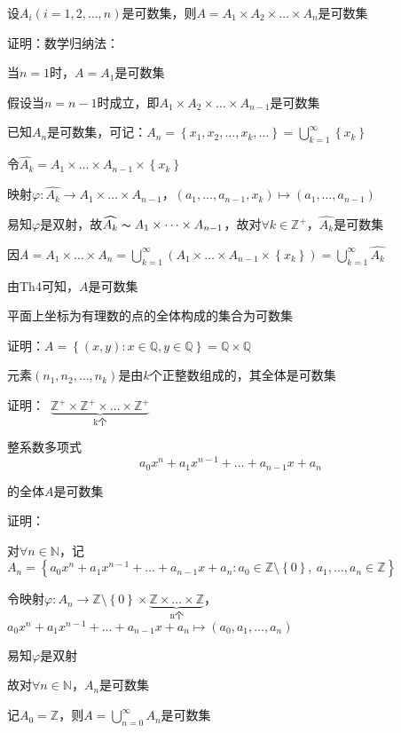 \begin{td}
设$A_{i}\left(i =1,2,\dots,n\right) $是可数集，则$A = A_{1} \times A_{2} \times \dots \times A_{n}$是可数集    
\end{td}
\noindent 证明：数学归纳法：
\par 当$n = 1$时，$A = A_{1}$是可数集
\par 假设当$n = n - 1$时成立，即$A_{1} \times A_{2} \times \dots \times A_{n-1}$是可数集
\par 已知$A_{n}$是可数集，可记：$A_{n} = \left\{x_{1},x_{2},\dots,x_{k},\dots\right\} = \bigcup \limits_{k=1}^{\infty}\left\{x_{k}\right\} $
\par 令$\widehat{A_{k}} = A_{1} \times \dots \times A_{n-1} \times \left\{x_{k}\right\} $
\par 映射$\varphi : \widehat{A_{k}} \to A_{1} \times \dots \times A_{n-1}$，$ \left(a_{1},\dots,a_{n-1},x_{k}\right) \mapsto \left(a_{1},\dots,a_{n-1}\right) $
\par 易知$\varphi $是双射，故$\widehat{A_{k}} \thicksim A_{1} \times \dots \times A_{n-1} $，故对$\forall k \in \mathbb{Z}^{+}$，$\widehat{A_{k}} $是可数集
\par 因$A = A_{1} \times \dots \times A_{n} = \bigcup \limits_{k=1}^{\infty}\left(A_{1} \times \dots \times A_{n-1} \times \left\{x_{k}\right\} \right) = \bigcup \limits_{k=1}^{\infty}\widehat{A_{k}}$
\par 由Th4可知，$A$是可数集

\begin{eg}
平面上坐标为有理数的点的全体构成的集合为可数集    
\end{eg}
\noindent 证明：$A = \left\{\left(x,y\right) : x \in \mathbb{Q} , y \in \mathbb{Q}\right\} = \mathbb{Q} \times \mathbb{Q}$

\begin{eg}
元素$\left(n_{1},n_{2},\dots,n_{k}\right) $是由$k$个正整数组成的，其全体是可数集    
\end{eg}
\noindent 证明：\ $\underbrace{\mathbb{Z}^{+} \times \mathbb{Z}^{+} \times \dots \times \mathbb{Z}^{+}} _\text{k个}$

\begin{eg}
整系数多项式
$$a_{0}x^{n} + a_{1}x^{n-1} + \dots + a_{n-1}x + a_{n}$$
\par \quad 的全体$A$是可数集    
\end{eg}
\noindent 证明：
\par 对$\forall n \in \mathbb{N}$，记$A_{n} = \left\{a_{0}x^{n} + a_{1}x^{n-1} + \dots + a_{n-1}x + a_{n} : a_{0} \in \mathbb{Z} \setminus \left\{0\right\}  , \  a_{1},\dots,a_{n} \in \mathbb{Z}\right\} $
\par 令映射$\varphi : A_{n} \to \mathbb{Z} \setminus \left\{0\right\} \times \underbrace{\mathbb{Z} \times \dots \times \mathbb{Z}}_\text{n个}$， \ $a_{0}x^{n} + a_{1}x^{n-1} + \dots + a_{n-1}x + a_{n} \mapsto \left(a_{0},a_{1},\dots,a_{n}\right) $
\par 易知$\varphi$是双射
\par 故对$\forall n \in \mathbb{N}$，$A_{n}$是可数集
\par 记$A_{0} = \mathbb{Z}$，则$A = \bigcup \limits_{n=0}^{\infty}A_{n}$是可数集

